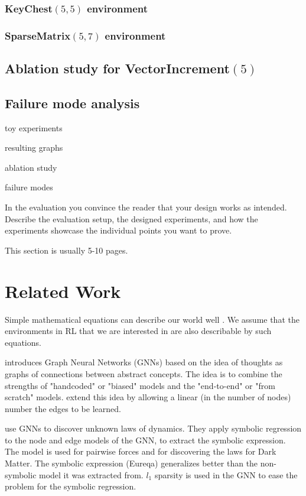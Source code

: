 \documentclass[a4paper,11pt,oneside]{report}
\begin{document}
\subsection{KeyChest$(5, 5)$ environment}
\subsection{SparseMatrix$(5, 7)$ environment}

\section{Ablation study for VectorIncrement$(5)$}

\section{Failure mode analysis}

toy experiments

resulting graphs

ablation study

failure modes

In the evaluation you convince the reader that your design works as intended.
Describe the evaluation setup, the designed experiments, and how the
experiments showcase the individual points you want to prove.

This section is usually 5-10 pages.


\chapter{Related Work}
\label{ch:related_work}

Simple mathematical equations can describe our world well \cite{hamming1980unreasonable}. We assume that the environments in RL that we are interested in are also describable by such equations.

\cite{Battaglia2018} introduces Graph Neural Networks (GNNs) based on the idea of thoughts as graphs of connections between abstract concepts. The idea is to combine the strengths of "handcoded" or "biased" models and the "end-to-end" or "from scratch" models. \cite{Velickovic2020} extend this idea by allowing a linear (in the number of nodes) number the edges to be learned.

\cite{Cranmer2020} use GNNs to discover unknown laws of dynamics. They apply symbolic regression to the node and edge models of the GNN, to extract the symbolic expression. The model is used for pairwise forces and for discovering the laws for Dark Matter. The symbolic expression (Eureqa) generalizes better than the non-symbolic model it was extracted from. $l_1$ sparsity is used in the GNN to ease the problem for the symbolic regression.
\end{document}
